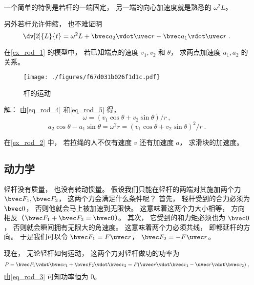 一个简单的特例是若杆的一端固定， 另一端的向心加速度就是熟悉的 $\omega^2L$。

另外若杆允许伸缩， 也不难证明
\begin{equation}
\dv[2]{L}{t} = \omega^2 L + \bvec a_2 \vdot \uvec r - \bvec a_1 \vdot \uvec r~.
\end{equation}


\begin{example}{}
在\autoref{ex_rod_1} 的模型中， 若已知端点的速度 $v_1, v_2$ 和 $\theta$， 求两点加速度 $a_1, a_2$ 的关系。
\begin{figure}[ht]
\centering
\texttt{[image: ./figures/f67d031b026f1d1c.pdf]}
\caption{杆的运动} \label{fig_rod_2}
\end{figure}

解： 由\autoref{eq_rod_4} 和\autoref{eq_rod_5} 得，
\begin{equation}
\omega = (v_1 \cos\theta + v_2 \sin\theta)/r~,
\end{equation}
\begin{equation}
a_2 \cos\theta - a_1 \sin\theta = \omega^2 r = (v_1 \cos\theta + v_2 \sin\theta)^2/r~.
\end{equation}
\end{example}

\begin{exercise}{}
在\autoref{ex_rod_2} 中， 若拉绳的人不仅有速度 $v$ 还有加速度 $a$， 求滑块的加速度。
\end{exercise}

\subsection{动力学}
轻杆没有质量， 也没有转动惯量。 假设我们只能在轻杆的两端对其施加两个力 $\bvec F_1, \bvec F_2$， 这两个力会满足什么条件呢？ 首先， 轻杆受到的合力必须为 $\bvec 0$， 否则他就会马上被加速到无限快。 这意味着这两个力大小相等， 方向相反（$\bvec F_1 + \bvec F_2 = \bvec 0$）。 其次， 它受到的和力矩必须也为 $\bvec 0$， 否则就会瞬间拥有无限大的角速度。 这意味着两个力必须共线， 即都延杆的方向。 于是我们可以令 $\bvec F_1 = F \uvec r$， $\bvec F_2 = -F \uvec r$。

现在， 无论轻杆如何运动， 这两个力对轻杆做功的功率为
\begin{equation}
P = \bvec F_1 \vdot \bvec v_1 + \bvec F_2 \vdot \bvec v_2 = F (\uvec r \vdot \bvec v_1 - \uvec r \vdot \bvec v_2)~,
\end{equation}
由\autoref{eq_rod_3} 可知功率恒为 0。
